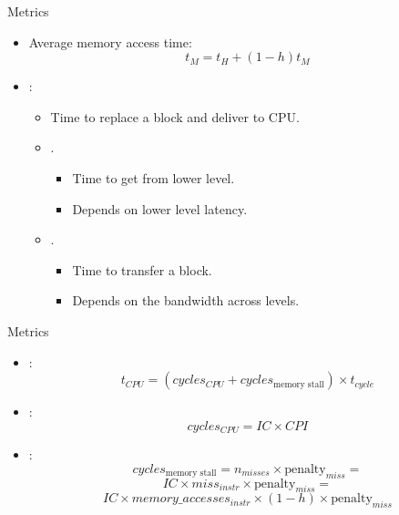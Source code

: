\begin{frame}[t]{Metrics}
\begin{itemize}
  \item Average memory access time:
\[
t_M = t_H + (1-h) t_M
\]
  \item {}:
    \begin{itemize}
      \item Time to replace a block and deliver to CPU.
      \item {}.
        \begin{itemize}
          \item Time to get from lower level.
          \item Depends on lower level latency.
        \end{itemize}
      \item {}.
        \begin{itemize}
          \item Time to transfer a block.
          \item Depends on the bandwidth across levels.
        \end{itemize}
    \end{itemize}
\end{itemize}
\end{frame}

\begin{frame}[t]{Metrics}
\begin{itemize}
  \item {}:
\[
t_{CPU} = 
\left( cycles_{CPU} + cycles_{\text{memory stall}} \right) \times t_{cycle}
\]

  \item {}:
\[
cycles_{CPU} =
IC \times CPI
\]

  \item {}:
\[
cycles_{\text{memory stall}} =
n_{misses} \times \text{penalty}_{miss}=
\]
\[
IC \times miss_{instr} \times \text{penalty}_{miss} =
\]
\[
IC \times memory\_accesses_{instr} \times (1 - h ) \times \text{penalty}_{miss}
\]
\end{itemize}
\end{frame}

